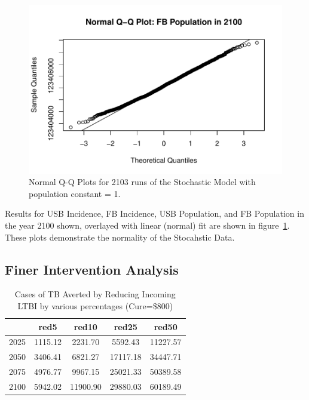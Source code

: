 \documentclass{amsart}
\begin{document}
\begin{figure}
    \includegraphics[scale=0.4]{figures/qqnormFBPop.pdf}
  \caption{Normal Q-Q Plots for 2103 runs of the Stochastic Model with population constant = 1.}
  \label{fig:qqnormPlots}
\end{figure}

Results for USB Incidence, FB Incidence, USB Population, and FB Population in the year
2100 shown, overlayed with linear (normal) fit are shown in
figure~\ref{fig:qqnormPlots}. These plots demonstrate the normality of the
Stocahstic Data. 
\subsection{Finer Intervention Analysis}

\begin{table}
\centering
\begin{tabular}{|r|cccc|} \hline
       & red5    & red10    & red25    & red50    \\ \hline
  2025 & 1115.12 & 2231.70  & 5592.43  & 11227.57 \\ 
  2050 & 3406.41 & 6821.27  & 17117.18 & 34447.71 \\ 
  2075 & 4976.77 & 9967.15  & 25021.33 & 50389.58 \\ 
  2100 & 5942.02 & 11900.90 & 29880.03 & 60189.49 \\ 
   \hline
\end{tabular}
\caption{Cases of TB Averted by Reducing Incoming LTBI by various percentages
         (Cure=\$800)} 
\label{tab:caRed}
\end{table}
\end{document}

